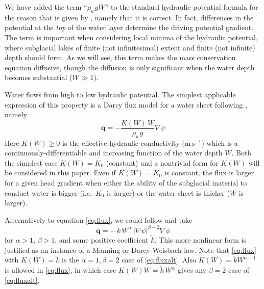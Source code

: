 \documentclass[11pt,final]{amsart}%
\newcommand\bq{\mathbf{q}}
\newcommand{\grad}{\nabla}
\begin{document}
We have added the term ``$\rho_w g W$'' to the standard hydraulic potential formula \citep[e.g.]{Clarke05} for the reason that is given by \cite{Hewittetal2012}, namely that it is correct.  In fact, differences in the potential at the \emph{top} of the water layer determine the driving potential gradient.  The term is important when considering local minima of the hydraulic potential, where subglacial lakes of finite (not infinitesimal) extent and finite (not infinite) depth should form.  As we will see, this term makes the mass conservation equation diffusive, though the diffusion is only significant when the water depth becomes substantial ($W\gg 1$).

Water flows from high to low hydraulic potential.  The simplest applicable expression of this property is a Darcy flux model for a water sheet following \cite{Clarke05}, namely
\begin{equation}  \label{eq:flux}
\bq = - \frac{K(W) \, W}{\rho_w g} \grad \psi
\end{equation}
Here $K(W)\ge 0$ is the effective hydraulic conductivity ($\text{m}\,\text{s}^{-1}$) which is a continuously-differentiable and increasing function of the water depth $W$.  Both the simplest case $K(W)=K_0$ (constant) and a nontrivial form for $K(W)$ will be considered in this paper.  Even if $K(W)=K_0$ is constant, the flux is larger for a given head gradient when either the ability of the subglacial material to conduct water is bigger (i.e.~$K_0$ is larger) or the water sheet is thicker ($W$ is larger).

Alternatively to equation \eqref{eq:flux}, we could follow \cite{Schoofetal2012} and take
\begin{equation}  \label{eq:fluxalt}
\bq = - \,\tilde k\, W^\alpha\, |\grad \psi|^{\beta-2} \grad \psi
\end{equation}
for $\alpha> 1$, $\beta>1$, and some positive coefficient $\tilde k$.  This more nonlinear form is justified as an instance of a Manning or Darcy-Weisbach law.  Note that \eqref{eq:flux} with $K(W)=\tilde k$ is the $\alpha=1,\beta=2$ case of \eqref{eq:fluxalt}.  Also $K(W)=\tilde k W^{\alpha-1}$ is allowed in \eqref{eq:flux}, in which case $K(W) W = \tilde k\, W^\alpha$ gives any $\beta=2$ case of \eqref{eq:fluxalt}.

\end{document}
